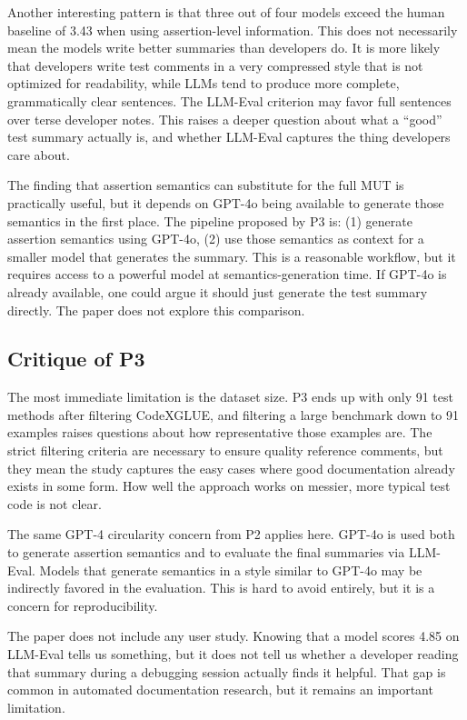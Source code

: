 \documentclass[
    pdftex,
    final,
    11pt,
    a4paper,
    parskip=false,
    oneside,
    footheight=0mm,
    footinclude=false,
    toc=bibliography
]{scrbook}
\begin{document}
Another interesting pattern is that three out of four models exceed the human baseline of 3.43 when using assertion-level information. This does not necessarily mean the models write better summaries than developers do. It is more likely that developers write test comments in a very compressed style that is not optimized for readability, while LLMs tend to produce more complete, grammatically clear sentences. The LLM-Eval criterion may favor full sentences over terse developer notes. This raises a deeper question about what a ``good'' test summary actually is, and whether LLM-Eval captures the thing developers care about.

The finding that assertion semantics can substitute for the full MUT is practically useful, but it depends on GPT-4o being available to generate those semantics in the first place. The pipeline proposed by P3 is: (1) generate assertion semantics using GPT-4o, (2) use those semantics as context for a smaller model that generates the summary. This is a reasonable workflow, but it requires access to a powerful model at semantics-generation time. If GPT-4o is already available, one could argue it should just generate the test summary directly. The paper does not explore this comparison.

\subsection{Critique of P3}

The most immediate limitation is the dataset size. P3 ends up with only 91 test methods after filtering CodeXGLUE, and filtering a large benchmark down to 91 examples raises questions about how representative those examples are. The strict filtering criteria are necessary to ensure quality reference comments, but they mean the study captures the easy cases where good documentation already exists in some form. How well the approach works on messier, more typical test code is not clear.

The same GPT-4 circularity concern from P2 applies here. GPT-4o is used both to generate assertion semantics and to evaluate the final summaries via LLM-Eval. Models that generate semantics in a style similar to GPT-4o may be indirectly favored in the evaluation. This is hard to avoid entirely, but it is a concern for reproducibility.

The paper does not include any user study. Knowing that a model scores 4.85 on LLM-Eval tells us something, but it does not tell us whether a developer reading that summary during a debugging session actually finds it helpful. That gap is common in automated documentation research, but it remains an important limitation.
\end{document}
